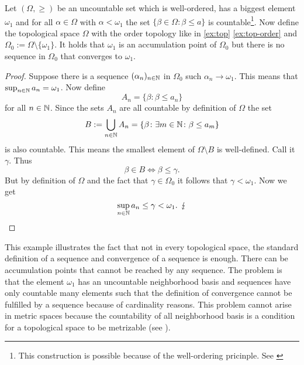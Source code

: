 \begin{ex}\label{ex:ordertop-uncount}
  Let $(\Omega, \geq)$ be an uncountable set which is well-ordered, has a biggest element $\omega_1$ and for all $\alpha \in \Omega$ with $\alpha < \omega_1$ the set $\{\beta \in \Omega\colon \beta \leq a\}$ is countable\footnote{This construction is possible because of the well-ordering pricinple. See \cite[p. 53]{BvQMT}}.
  Now define the topological space $\Omega$ with the order topology like in \ref{ex:top} \ref{ex:top-order} and $\Omega_0 := \Omega\setminus \{\omega_1\}$.
  It holds that $\omega_1$ is an accumulation point of $\Omega_0$ but there is no sequence in $\Omega_0$ that converges to $\omega_1$.
\end{ex}

\begin{proof}
  Suppose there is a sequence $(\alpha_n)_{n\in\mathbb{N}}$ in $\Omega_0$ such $\alpha_n \to \omega_1$. This means that $\sup_{n\in\mathbb{N}} a_n = \omega_1$. Now define
  \begin{equation*}
    A_n = \{\beta\colon \beta \leq a_n\}
  \end{equation*}
  for all $n \in \mathbb{N}$. Since the sets $A_n$ are all countable by definition of $\Omega$ the set
  \begin{equation*}
    B := \bigcup\limits_{n\in\mathbb{N}} A_n = \{\beta\colon \exists m\in\mathbb{N} \colon \beta \leq a_m \}
  \end{equation*}
  is also countable. This means the smallest element of $\Omega\setminus B$ is well-defined. Call it $\gamma$. Thus
  \begin{equation*}
    \beta \in B \iff \beta \leq \gamma. 
  \end{equation*}
  But by definition of $\Omega$ and the fact that $\gamma \in \Omega_0$ it follows that $\gamma < \omega_1$. Now we get
  \begin{equation*}
    \sup\limits_{n\in\mathbb{N}} a_n \leq \gamma < \omega_1. \:\: \lightning
  \end{equation*}
\end{proof}

This example illustrates the fact that not in every topological space, the standard definition of a sequence and convergence of a sequence is enough. There can be accumulation points that cannot be reached by any sequence. The problem is that the element $\omega_1$ has an uncountable neighborhood basis and sequences have only countable many elements such that the definition of convergence cannot be fulfilled by a sequence because of cardinality reasons. This problem cannot arise in metric spaces because the countability of all neighborhood basis is a condition for a topological space to be metrizable (see \cite[p. 130f]{MunTop}).

